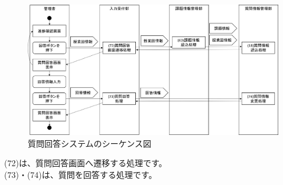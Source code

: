 \begin{figure}[htbp]
  \begin{center}
    \includegraphics[width=1\linewidth,clip]{./img/seq19.png}
    \caption{質問回答システムのシーケンス図}\label{fig:seq19}
  \end{center}
\end{figure}

(72)は、質問回答画面へ遷移する処理です。\\
(73)・(74)は、質問を回答する処理です。

